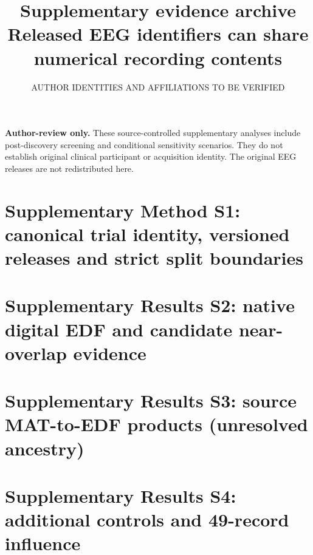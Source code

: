\documentclass[11pt,a4paper]{article}
\title{Supplementary evidence archive\\
Released EEG identifiers can share numerical recording contents}
\author{AUTHOR IDENTITIES AND AFFILIATIONS TO BE VERIFIED}
\date{}
\begin{document}
\maketitle
\noindent \textbf{Author-review only.} These source-controlled
supplementary analyses include post-discovery screening and
conditional sensitivity scenarios. They do not establish
original clinical participant or acquisition identity.
The original EEG releases are not redistributed here.

\section{Supplementary Method S1: canonical trial identity, versioned releases and strict split boundaries}



\FloatBarrier

\section{Supplementary Results S2: native digital EDF and candidate near-overlap evidence}









\FloatBarrier

\section{Supplementary Results S3: source MAT-to-EDF products (unresolved ancestry)}




\FloatBarrier

\section{Supplementary Results S4: additional controls and 49-record influence}



\FloatBarrier



\end{document}
